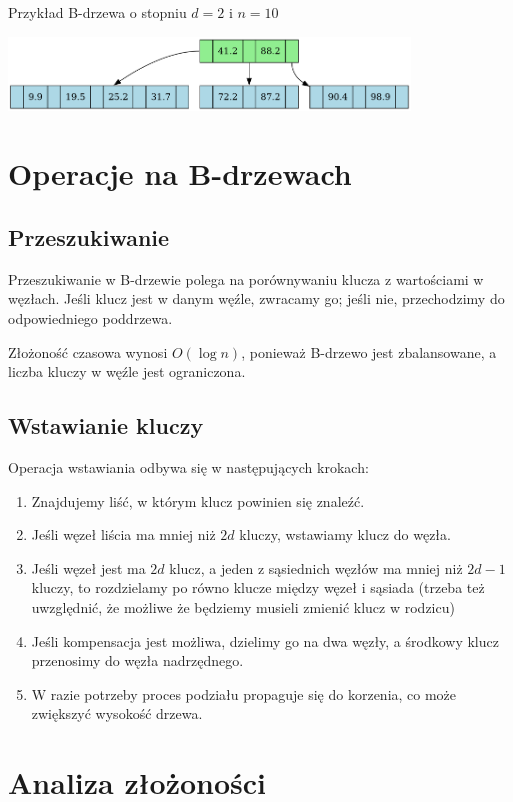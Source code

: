 \documentclass{article}
\begin{document}
\begin{center}
Przykład B-drzewa o stopniu $d=2$ i $n=10$

\includegraphics[width=0.8\textwidth]{images/bdrzewo-10.png}    
\end{center}

\section{Operacje na B-drzewach}
\subsection{Przeszukiwanie}
Przeszukiwanie w B-drzewie polega na porównywaniu klucza z wartościami w węzłach. Jeśli klucz jest w danym węźle, zwracamy go; jeśli nie, przechodzimy do odpowiedniego poddrzewa.

Złożoność czasowa wynosi $O(\log n)$, ponieważ B-drzewo jest zbalansowane, a liczba kluczy w węźle jest ograniczona.

\subsection{Wstawianie kluczy}
Operacja wstawiania odbywa się w następujących krokach:
\begin{enumerate}
    \item Znajdujemy liść, w którym klucz powinien się znaleźć.
    \item Jeśli węzeł liścia ma mniej niż $2d$ kluczy, wstawiamy klucz do węzła.
    \item Jeśli węzeł jest ma $2d$ klucz, a jeden z sąsiednich węzłów ma mniej niż $2d - 1$ kluczy, to rozdzielamy po równo klucze między węzeł i sąsiada (trzeba też uwzględnić, że możliwe że będziemy musieli zmienić klucz w rodzicu)
    \item Jeśli kompensacja jest możliwa, dzielimy go na dwa węzły, a środkowy klucz przenosimy do węzła nadrzędnego.
    \item W razie potrzeby proces podziału propaguje się do korzenia, co może zwiększyć wysokość drzewa.
\end{enumerate}

\section{Analiza złożoności}
\end{document}
